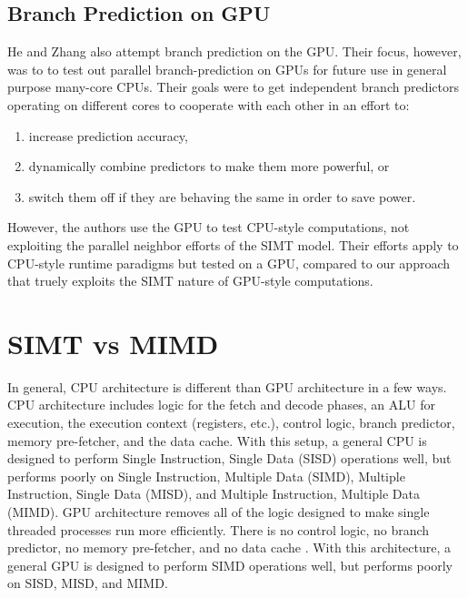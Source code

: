 \documentclass[conference]{IEEEtran}
\begin{document}

\subsection{Branch Prediction on GPU}

He and Zhang \cite{Zhang09} also attempt branch prediction on the GPU.  Their focus, however, was to to test out parallel branch-prediction on GPUs for future use in general purpose many-core CPUs.  Their goals were to get independent branch predictors operating on different cores to cooperate with each other in an effort to:

\begin{enumerate}
	\item increase prediction accuracy,
	\item dynamically combine predictors to make them more powerful, or
	\item switch them off if they are behaving the same in order to save power.
\end{enumerate}

However, the authors use the GPU to test CPU-style computations, not exploiting the parallel neighbor efforts of the SIMT model.  Their efforts apply to CPU-style runtime paradigms but tested on a GPU, compared to our approach that truely exploits the SIMT nature of GPU-style computations.

\section{SIMT vs MIMD }
\label{simt-description}
In general, CPU architecture is different than GPU architecture in a few ways.  CPU architecture includes logic for the fetch and decode phases, an ALU for execution, the execution context (registers, etc.), control logic, branch predictor, memory pre-fetcher, and the data cache.  With this setup, a general CPU is designed to perform Single Instruction, Single Data (SISD) operations well, but performs poorly on Single Instruction, Multiple Data (SIMD), Multiple Instruction, Single Data (MISD), and Multiple Instruction, Multiple Data (MIMD).  GPU architecture removes all of the logic designed to make single threaded processes run more efficiently.  There is no control logic, no branch predictor, no memory pre-fetcher, and no data cache \cite{SIG09}.  With this architecture, a general GPU is designed to perform SIMD operations well, but performs poorly on SISD, MISD, and MIMD. 
\end{document}
